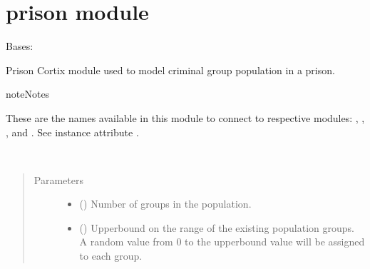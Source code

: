 \documentclass[letterpaper,10pt,openany,oneside,english]{sphinxmanual}
\begin{document}
\section{prison module}
\label{\detokenize{examples_rst/prison:module-prison}}\label{\detokenize{examples_rst/prison:prison-module}}\label{\detokenize{examples_rst/prison::doc}}

\begin{fulllineitems}
\label{\detokenize{examples_rst/prison:prison.Prison}}
Bases: 

Prison Cortix module used to model criminal group population in a prison.

\begin{sphinxadmonition}{note}{Notes}

These are the  names available in this module to connect to respective
modules: , , , and .
See instance attribute .
\end{sphinxadmonition}

\begin{fulllineitems}
\label{\detokenize{examples_rst/prison:prison.Prison.__init__}}~\begin{quote}\begin{description}
\item[{Parameters}] \leavevmode\begin{itemize}
\item {} 
 () \textendash{} Number of groups in the population.

\item {} 
 () \textendash{} Upperbound on the range of the existing population groups. A random value
from 0 to the upperbound value will be assigned to each group.


\end{itemize}
\end{description}
\end{quote}
\end{fulllineitems}
\end{fulllineitems}
\end{document}
